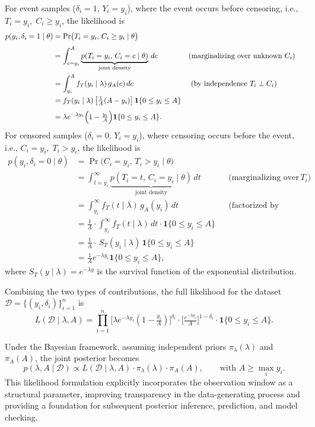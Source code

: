 For event samples ($\delta_i=1,\, Y_i=y_i$), where the event occurs before censoring, i.e., $T_i = y_i,\; C_i \ge y_i$, the likelihood is
{\footnotesize
\begin{align}
p(y_i,\delta_i=1\mid\theta)
 &= \Pr\bigl(T_i=y_i,\,C_i\ge y_i \mid \theta\bigr) \\[3pt]
 &= \int_{c=y_i}^{A} \underbrace{p(T_i=y_i,\,C_i=c \mid \theta)}_{\text{joint density}}\,dc 
    &&\text{(marginalizing over unknown $C_i$)}\\
 &= \int_{y_i}^{A} f_T(y_i\mid\lambda)\,g_A(c)\,dc 
    && \text{ (by independence }T_i\perp C_i)\\
 &= f_T(y_i\mid\lambda)\,
    \bigl[\tfrac1A(A-y_i)\bigr]\,
    \mathbf 1\{0\le y_i\le A\}\\[3pt]
 &= \lambda e^{-\lambda y_i}\Bigl(1-\tfrac{y_i}{A}\Bigr)
    \mathbf 1\{0\le y_i\le A\}.
\end{align}}
For censored samples ($\delta_i=0,\, Y_i=y_i$), where censoring occurs before the event, i.e., $C_i = y_i,\; T_i > y_i$, the likelihood is
{\footnotesize
\begin{align}
p(y_i,\delta_i=0\mid\theta)
 &= \Pr\bigl(C_i=y_i,\,T_i>y_i \mid \theta\bigr) \\[0pt]
 &= \int_{t=y_i}^{\infty} 
    \underbrace{p(T_i=t,\,C_i=y_i \mid \theta)}_{\text{joint density}}\,dt
    &&\text{(marginalizing over unknown }T_i)\\[0pt]
 &= \int_{y_i}^{\infty} f_T(t\mid\lambda)\,g_A(y_i)\,dt
    &&\text{(factorized by independence)}\\[0pt]
 &= \frac{1}{A} \cdot \int_{y_i}^{\infty} f_T(t \mid \lambda) \, dt \cdot \mathbf{1}\{0 \le y_i \le A\} \\
 &= \frac{1}{A}\cdot \,S_T(y_i\mid\lambda)\,
    \mathbf 1\{0\le y_i\le A\}\\[3pt]
 &= \tfrac1A e^{-\lambda y_i}\mathbf 1\{0\le y_i\le A\},
\end{align}}
where $S_T(y\mid\lambda)=e^{-\lambda y}$ is the survival function of the exponential distribution.

Combining the two types of contributions, the full likelihood for the dataset $\mathcal{D} = \{(y_i, \delta_i)\}_{i=1}^n$ is
\begin{equation}
L(\mathcal{D}\mid\lambda,A)=
\prod_{i=1}^n
\bigl[\lambda e^{-\lambda y_i}(1-\tfrac{y_i}{A})\bigr]^{\delta_i}
\cdot \bigl[\tfrac{e^{-\lambda y_i}}{A}\bigr]^{1-\delta_i}
\cdot \mathbf 1\{0\le y_i \le A\}.
\end{equation}

Under the Bayesian framework, assuming independent priors $\pi_\lambda(\lambda)$ and $\pi_A(A)$, the joint posterior becomes
\begin{equation}
p(\lambda, A \mid \mathcal{D}) \propto 
L(\mathcal{D} \mid \lambda, A)\cdot
\pi_\lambda(\lambda)\cdot
\pi_A(A),
\qquad \text{with } A \ge \max_i y_i.
\end{equation}
This likelihood formulation explicitly incorporates the observation window as a structural parameter, improving transparency in the data-generating process and providing a foundation for subsequent posterior inference, prediction, and model checking.
